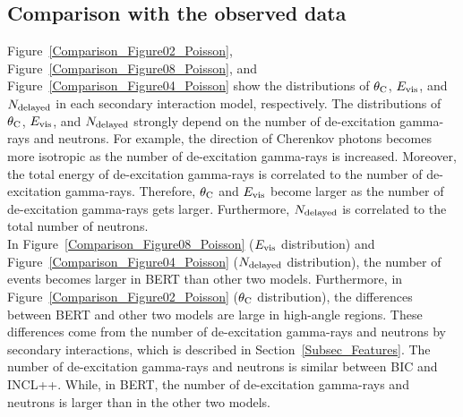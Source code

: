 \clearpage
\subsection{Comparison with the observed data}\label{Subsec_Comp_data}
\vs\hs
Figure~\ref{Comparison_Figure02_Poisson}, Figure~\ref{Comparison_Figure08_Poisson}, and Figure~\ref{Comparison_Figure04_Poisson} show the distributions of $\theta_{\rm C}$, $E_{\rm vis}$, and $N_{\rm delayed}$ in each secondary interaction model, respectively.
The distributions of $\theta_{\rm C}$, $E_{\rm vis}$, and $N_{\rm delayed}$ strongly depend on the number of de-excitation gamma-rays and neutrons.
For example, the direction of Cherenkov photons becomes more isotropic as the number of de-excitation gamma-rays is increased.
Moreover, the total energy of de-excitation gamma-rays is correlated to the number of de-excitation gamma-rays.
Therefore, $\theta_{\rm C}$ and $E_{\rm vis}$ become larger as the number of de-excitation gamma-rays gets larger.
Furthermore, $N_{\rm delayed}$ is correlated to the total number of neutrons.\\
\hs
In Figure~\ref{Comparison_Figure08_Poisson} ($E_{\rm vis}$ distribution) and Figure~\ref{Comparison_Figure04_Poisson} ($N_{\rm delayed}$ distribution), the number of events becomes larger in BERT than other two models.
Furthermore, in Figure~\ref{Comparison_Figure02_Poisson} ($\theta_{\rm C}$ distribution), the differences between BERT and other two models are large in high-angle regions.
These differences come from the number of de-excitation gamma-rays and neutrons by secondary interactions, which is described in Section~\ref{Subsec_Features}.
The number of de-excitation gamma-rays and neutrons is similar between BIC and INCL++.
While, in BERT, the number of de-excitation gamma-rays and neutrons is larger than in the other two models.


